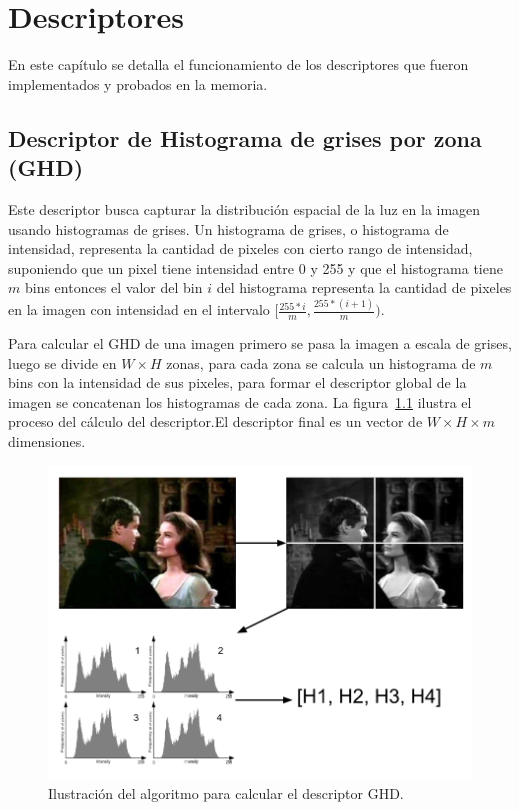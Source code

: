 \chapter{Descriptores}
 En este capítulo se detalla el funcionamiento de los descriptores que fueron implementados y probados en la memoria.

\section{Descriptor de Histograma de grises por zona (GHD)}
Este descriptor busca capturar la distribución espacial de la luz en la imagen usando histogramas de grises. Un histograma de grises, o histograma de intensidad, representa la cantidad de pixeles con cierto rango de intensidad, suponiendo que un pixel tiene intensidad entre 0 y 255 y que el histograma tiene $m$ bins entonces el valor del bin $i$ del histograma representa la cantidad de pixeles en la imagen con intensidad en el intervalo $[\frac{255*i}{m},\frac{255*(i+1)}{m})$.

Para calcular el GHD de una imagen primero se pasa la imagen a escala de grises, luego se divide en $W \times H$ zonas, para cada zona se calcula un histograma de $m$ bins con la intensidad de sus pixeles, para formar el descriptor global de la imagen se concatenan los histogramas de cada zona. La figura~\ref{descriptor_ghd} ilustra el proceso del cálculo del descriptor.El descriptor final es un vector de $W \times H \times m$ dimensiones.
    \begin{figure}[!h]
		\centering
		\includegraphics[scale=0.4]{imagenes/cap3/descriptor_ghd.png}
		\caption{Ilustración del algoritmo para calcular el descriptor GHD.}
		\label{descriptor_ghd}
	\end{figure}

